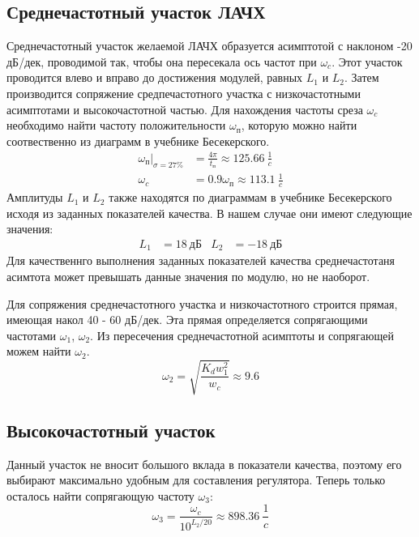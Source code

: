 \documentclass[russian, utf8]{eskdtext}
\begin{document}
\subsection{Среднечастотный участок ЛАЧХ}
Среднечастотный участок желаемой ЛАЧХ образуется асимптотой с наклоном -20 дБ/дек, проводимой так, чтобы она пересекала ось частот при $\omega_c$. Этот участок проводится влево и вправо до достижения модулей, равных $L_1$ и $L_2$. Затем производится сопряжение средпечастотного участка с низкочастотными асимптотами и высокочастотной частью. Для нахождения частоты среза $\omega_c$ необходимо найти частоту положительности $\omega_\text{п}$, которую можно найти соотвественно из диаграмм в учебнике Бесекерского.
\begin{align*}
    \omega_\text{п}|_{\sigma = 27\%} & = \frac{4\pi}{t_\text{п}} \approx 125.66\ \frac{1}{c} \\
    \omega_c & = 0.9\omega_\text{п} \approx 113.1\ \frac{1}{c} 
\end{align*}
Амплитуды $L_1$ и $L_2$ также находятся по диаграммам в учебнике Бесекерского исходя из заданных показателей качества. В нашем случае они имеют следующие значения:
\begin{align*}
    L_1 & = 18\ \text{дБ} & L_2 & = -18\ \text{дБ}
\end{align*}
Для качественнго выполнения заданных показателей качества среднечастотаня асимтота может превышать данные значения по модулю, но не наоборот. \par
Для сопряжения среднечастотного участка и низкочастотного строится прямая, имеющая накол 40 - 60 дБ/дек. Эта прямая определяется сопрягающими частотами $\omega_1$, $\omega_2$. Из пересечения среднечастотной асимптоты и сопрягающей можем найти $\omega_2$.
\begin{equation*}
    \omega_2 = \sqrt{\frac{K_dw_1^2}{w_c}} \approx 9.6
\end{equation*}\par

\subsection{Высокочастотный участок}
Данный участок не вносит большого вклада в показатели качества, поэтому его выбирают максимально удобным для составления регулятора.
Теперь только осталось найти сопрягающую частоту $\omega_{3}$:
\begin{equation*}
    \omega_{3} = \frac{\omega_c}{10^{L_2/20}} \approx 898.36\ \frac{1}{c}
\end{equation*}
\end{document}
